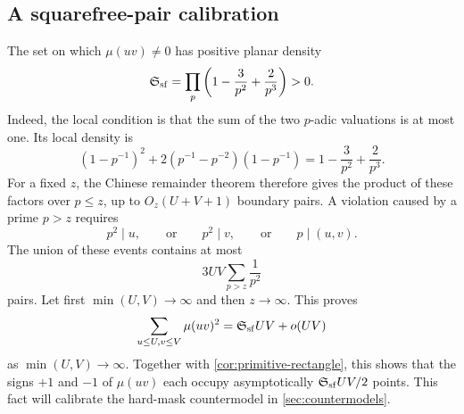 \subsection{A squarefree-pair calibration}

The set on which \(\mu(uv)\ne0\) has positive planar density
\begin{equation}
 \mathfrak S_{\rm sf}
 =
 \prod_p\left(1-\frac3{p^2}+\frac2{p^3}\right)>0.
\label{eq:squarefree-pair-density}
\end{equation}
Indeed, the local condition is that the sum of the two \(p\)-adic
valuations is at most one.  Its local density is
\[
 (1-p^{-1})^2
 +2(p^{-1}-p^{-2})(1-p^{-1})
 =
 1-\frac3{p^2}+\frac2{p^3}.
\]
For a fixed \(z\), the Chinese remainder theorem therefore gives the
product of these factors over \(p\le z\), up to
\(O_z(U+V+1)\) boundary pairs.  A violation caused by a prime \(p>z\)
requires
\[
 p^2\mid u,\qquad\text{or}\qquad
 p^2\mid v,\qquad\text{or}\qquad p\mid(u,v).
\]
The union of these events contains at most
\[
 3UV\sum_{p>z}\frac1{p^2}
\]
pairs.  Let first \(\min(U,V)\to\infty\) and then \(z\to\infty\).
This proves
\begin{equation}
 \sum_{u\le U,v\le V}\mu(uv)^2
 =
 \mathfrak S_{\rm sf}UV+o(UV)
\label{eq:squarefree-pair-asymptotic}
\end{equation}
as \(\min(U,V)\to\infty\).  Together with
\cref{cor:primitive-rectangle}, this shows that the signs \(+1\) and
\(-1\) of \(\mu(uv)\) each occupy asymptotically
\(\mathfrak S_{\rm sf}UV/2\) points.  This fact will calibrate the hard-mask
countermodel in \cref{sec:countermodels}.
